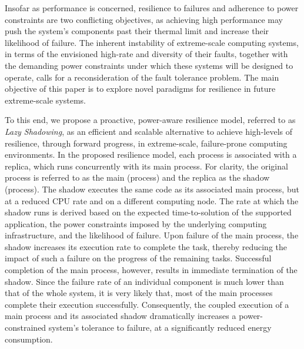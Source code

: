 Insofar as performance is concerned, resilience to failures and adherence to 
power constraints are two conflicting objectives, as achieving high performance may push
the system's components past their thermal limit and increase their likelihood of failure.
The inherent instability of extreme-scale computing systems, in terms of the envisioned high-rate and 
diversity of their faults, together with the demanding power constraints under which these systems will be
designed to operate, %
calls for a reconsideration of the fault tolerance problem. The main objective
of this paper is to explore novel paradigms for resilience in future extreme-scale
systems. 

To this end, we propose a proactive, power-aware resilience model, referred to as \textit{Lazy
Shadowing}, as an efficient and scalable alternative to achieve high-levels of resilience, through
forward progress, in extreme-scale, failure-prone computing environments. In the proposed
resilience model, each process is associated with a replica, which runs concurrently with its main 
process. For clarity, the original process is referred to as the main (process) and the replica as the 
shadow (process). The shadow executes the same code as its
associated main process, but at a reduced CPU rate and on a different computing node. The rate
at which the shadow runs is derived based on the expected time-to-solution of the supported
application, the power constraints imposed by the underlying computing infrastructure, and the
likelihood of failure. Upon failure of the main process, the shadow increases its 
execution rate to complete the task, thereby reducing the impact of such a failure on the progress of
the remaining tasks. Successful completion of the main process, however, results in immediate
termination of the shadow. Since the failure rate of an individual component is much lower than that of 
the whole system, it is very likely that, most of the main processes complete their execution
successfully. Consequently, the coupled execution of a main process and its associated shadow 
dramatically increases a power-constrained system's tolerance to failure, at a significantly reduced
energy consumption.

